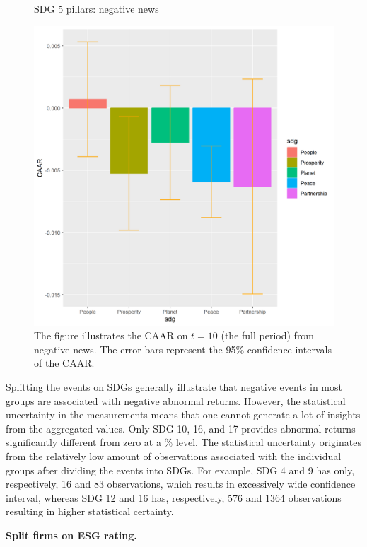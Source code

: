 \begin{figure} [H]
    \centering
    \caption{SDG 5 pillars: negative news}
    \includegraphics[scale=0.6]{Projekt/1.Figures analysis/ST_negative_sdg_bar_groups_0.png}
    \caption*{\footnotesize The figure illustrates the CAAR on $t = 10$ (the full period) from negative news. The error bars represent the 95\% confidence intervals of the CAAR.}
    \label{fig:ST_neg_bar}
\end{figure}




Splitting the events on SDGs generally illustrate that negative events in most groups are associated with negative abnormal returns. However, the statistical uncertainty in the measurements means that one cannot generate a lot of insights from the aggregated values. Only SDG 10, 16, and 17 provides abnormal returns significantly different from zero at a \% level. The statistical uncertainty originates from the relatively low amount of observations associated with the individual groups after dividing the events into SDGs. For example, SDG 4 and 9 has only, respectively, 16 and 83 observations, which results in excessively wide confidence interval, whereas SDG 12 and 16 has, respectively, 576 and 1364 observations resulting in higher statistical certainty.   

\noindent \textbf{Split firms on ESG rating.} 

